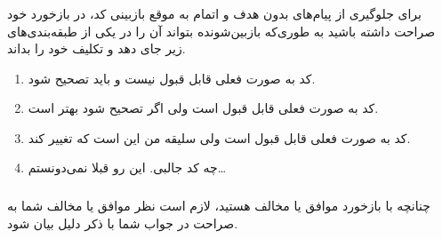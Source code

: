 \subsubsection{}
برای جلوگیری از پیام‌های بدون هدف و اتمام به موقع بازبینی کد، در بازخورد خود صراحت داشته باشید به طوری‌که بازبین‌شونده بتواند آن را در یکی از طبقه‌بندی‌های زیر جای دهد و تکلیف خود را بداند.
\begin{enumerate}[label=\Alph*)]
	\item
	      کد به صورت فعلی قابل قبول نیست و باید تصحیح شود.
	\item
	      کد به صورت فعلی قابل قبول است ولی اگر تصحیح شود بهتر است.
	\item
	      کد به صورت فعلی قابل قبول است ولی سلیقه من این است که تغییر کند.
	\item
	      چه کد جالبی. این رو قبلا نمی‌دونستم…

\end{enumerate}
\subsubsection{}
چنانچه با بازخورد موافق یا مخالف هستید، لازم است نظر موافق یا مخالف شما به صراحت در جواب شما با ذکر دلیل بیان شود.
